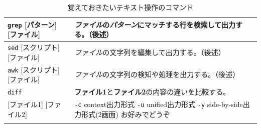 \documentclass[a4j]{ltjreport}
\begin{document}
\begin{longtable}[c]{|p{3.5cm}|p{13.5cm}|}
        \texttt{grep} {\footnotesize [パターン] [ファイル]}  &\emph{ファイル}の\emph{パターン}にマッチする行を検索して出力する。（後述）\\
        \hline
        \texttt{sed} {\footnotesize [スクリプト] [ファイル]}   &\emph{ファイル}の文字列を編集して出力する。（後述）\\
        \hline
        \texttt{awk} {\footnotesize [スクリプト] [ファイル]} &\emph{ファイル}の文字列の検知や処理を出力する。（後述）\\
        \hline

        \texttt{diff}&\textbf{ファイル1}と\textbf{ファイル2}の内容の違いを比較する。\\
        {\small [ファイル1] [ファイル2]} &\texttt{-c} context出力形式 \texttt{-u} unified出力形式 \texttt{-y} side-by-side出力形式(2画面) お好みでどうぞ\\
        \hline
        \caption{覚えておきたいテキスト操作のコマンド}
    \end{longtable}
\end{document}
